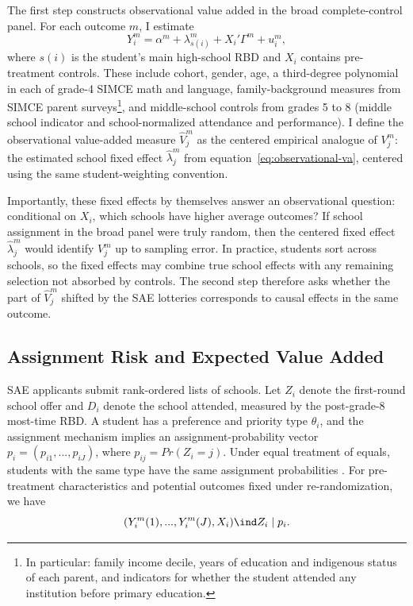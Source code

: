 \documentclass[a4paper, article, english, oneside, unknownkeysallowed, 12pt]{memoir}
\begin{document}
The first step constructs observational value added in the broad complete-control panel.
For each outcome $m$, I estimate
\begin{equation}
  Y_i^m = \alpha^m + \lambda_{s(i)}^m + X_i'\Gamma^m + u_i^m,
  \label{eq:observational-va}
\end{equation}
where $s(i)$ is the student's main high-school RBD and $X_i$ contains pre-treatment controls.
These include cohort, gender, age, a third-degree polynomial in each of grade-4 SIMCE math and language, family-background measures from SIMCE parent surveys\footnote{In particular: family income decile, years of education and indigenous status of each parent, and indicators for whether the student attended any institution before primary education.}, and middle-school controls from grades 5 to 8 (middle school indicator and school-normalized attendance and performance).
I define the observational value-added measure $\widehat{V}_j^m$ as the centered empirical analogue of $V_j^m$: the estimated school fixed effect $\widehat{\lambda}_j^m$ from equation~\eqref{eq:observational-va}, centered using the same student-weighting convention.

Importantly, these fixed effects by themselves answer an observational question: conditional on $X_i$, which schools have higher average outcomes?
If school assignment in the broad panel were truly random, then the centered fixed effect $\widehat{\lambda}_j^m$ would identify $V_j^m$ up to sampling error.
In practice, students sort across schools, so the fixed effects may combine true school effects with any remaining selection not absorbed by controls.
The second step therefore asks whether the part of $\widehat{V}_j^m$ shifted by the SAE lotteries corresponds to causal effects in the same outcome.


\subsection{Assignment Risk and Expected Value Added}

SAE applicants submit rank-ordered lists of schools.
Let $Z_i$ denote the first-round school offer and $D_i$ denote the school attended, measured by the post-grade-8 most-time RBD.
A student has a preference and priority type $\theta_i$, and the assignment mechanism implies an assignment-probability vector $p_i=(p_{i1},...,p_{iJ})$, where $p_{ij}=Pr(Z_i=j)$.
Under equal treatment of equals, students with the same type have the same assignment probabilities \parencite{abdulkadiroglu_research_2017}.
For pre-treatment characteristics and potential outcomes fixed under re-randomization, we have
\begin{equation}
  (Y_i^m(1),...,Y_i^m(J), X_i) \ind Z_i \mid p_i.
  \label{eq:offer-independence}
\end{equation}
\end{document}

